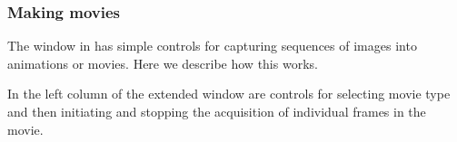 
\subsubsection{Making movies}
\label{sec:view-movies} 

The \viewer{} window in \SR{} has simple controls for capturing sequences
of images into animations or movies.  Here we describe how this works.

In the left column of the extended \viewer{} window are controls for
selecting movie type and then initiating and stopping the acquisition of
individual frames in the movie.

